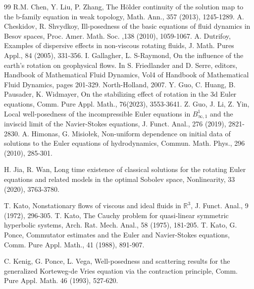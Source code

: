 \documentclass[12pt]{article}
\begin{document}
\begin{thebibliography}{99}
 R.M. Chen, Y. Liu, P. Zhang, The H\"{o}lder continuity of the solution map to the b-family equation in weak topology, Math. Ann., 357 (2013), 1245-1289.
 A. Cheskidov, R. Shvydkoy, Ill-posedness of the basic equations of fluid dynamics in Besov spaces, Proc. Amer. Math. Soc. ,138 (2010), 1059-1067.
 A. Dutrifoy, Examples of dispersive effects in non-viscous rotating fluids, J. Math. Pures Appl., 84 (2005), 331-356.
 I. Gallagher, L. S-Raymond, On the influence of the earth's rotation on geophysical flows. In S. Friedlander and D. Serre, editors, Handbook of Mathematical Fluid Dynamics, Vol4 of Handbook of Mathematical Fluid Dynamics, pages 201-329. North-Holland, 2007.
 Y. Guo, C. Huang, B. Pausader, K. Widmayer, On the stabilizing effect of rotation in the 3d Euler equations, Comm. Pure Appl. Math., 76(2023), 3553-3641.
 Z. Guo, J. Li, Z. Yin, Local well-posedness of the incompressible Euler equations in $B^1_{\infty,1}$ and the inviscid limit of the Navier-Stokes equations, J. Funct. Anal., 276 (2019), 2821-2830.
 A. Himonas, G. Misio{\l}ek, Non-uniform dependence on initial data of solutions to the Euler equations of hydrodynamics, Commun. Math. Phys., 296 (2010), 285-301.


 H. Jia, R. Wan, Long time existence of classical solutions for the rotating Euler equations and related models in the optimal Sobolev space, Nonlinearity, 33 (2020), 3763-3780.

 T. Kato, Nonstationary flows of viscous and ideal fluids in $\mathbb{R}^3$, J. Funct. Anal., 9 (1972), 296-305.
 T. Kato, The Cauchy problem for quasi-linear symmetric hyperbolic systems, Arch. Rat. Mech. Anal., 58 (1975), 181-205.
 T. Kato, G. Ponce, Commutator estimates and the Euler and Navier-Stokes equations, Comm. Pure Appl. Math., 41 (1988), 891-907.

 C. Kenig, G. Ponce, L. Vega, Well-posedness and scattering results for the generalized Korteweg-de Vries equation via the contraction principle, Comm. Pure Appl. Math. 46 (1993), 527-620.


\end{thebibliography}
\end{document}
